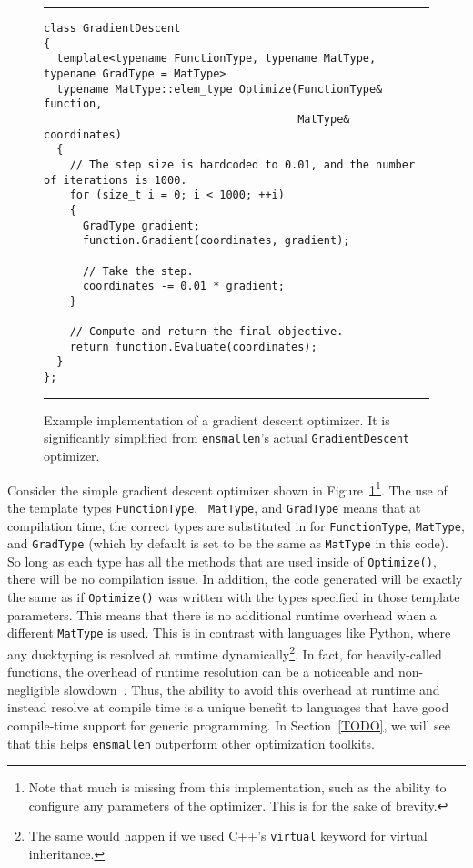 \begin{figure}[t]
\hrule
\vspace{1ex}
\begin{verbatim}
class GradientDescent
{
  template<typename FunctionType, typename MatType, typename GradType = MatType>
  typename MatType::elem_type Optimize(FunctionType& function,
                                       MatType& coordinates)
  {
    // The step size is hardcoded to 0.01, and the number of iterations is 1000.
    for (size_t i = 0; i < 1000; ++i)
    {
      GradType gradient;
      function.Gradient(coordinates, gradient);

      // Take the step.
      coordinates -= 0.01 * gradient;
    }

    // Compute and return the final objective.
    return function.Evaluate(coordinates);
  }
};
\end{verbatim}
\hrule
\vspace*{-0.5em}
\caption{Example implementation of a gradient descent optimizer.  It is
significantly simplified from {\tt ensmallen}'s actual {\tt GradientDescent}
optimizer.}
\label{fig:gd}
\end{figure}

Consider the simple gradient descent optimizer shown in
Figure~\ref{fig:gd}\footnote{Note that much is missing from this implementation,
such as the ability to configure any parameters of the optimizer.  This is for
the sake of brevity.}.  The use of the template types {\tt FunctionType}, {\tt
MatType}, and {\tt GradType} means that at compilation time, the correct types are
substituted in for {\tt FunctionType}, {\tt MatType}, and {\tt GradType} (which
by default is set to be the same as {\tt MatType} in this code).  So long as
each type has all the methods that are used inside of {\tt Optimize()}, there
will be no compilation issue.  In addition, the code generated will be exactly
the same as if {\tt Optimize()} was written with the types specified in those
template parameters.  This means that there is no additional runtime overhead
when a different {\tt MatType} is used.  This is in contrast with languages like
Python, where any ducktyping is resolved at runtime dynamically\footnote{The
same would happen if we used C++'s {\tt virtual} keyword for virtual
inheritance.}.  In fact, for heavily-called functions, the overhead of runtime
resolution can be a noticeable and non-negligible slowdown~\cite{TODO}.
Thus, the ability to avoid this overhead at runtime and instead resolve at
compile time is a unique benefit to languages that have good compile-time
support for generic programming.  In Section~\ref{TODO}, we will see that this
helps {\tt ensmallen} outperform other optimization toolkits.

